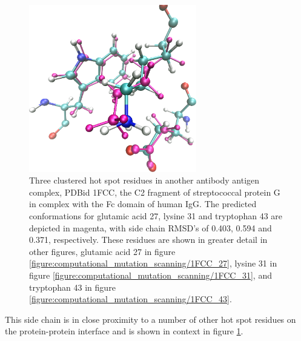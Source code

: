 \begin{figure}[h]
  \centering
  \includegraphics[width=0.65\textwidth,height=0.3\textheight,keepaspectratio]{figures/mutation_side_chain_images/1fcc_27_31_43.png}
  \caption{Three clustered hot spot residues in another antibody antigen complex, PDBid 1FCC, the C2 fragment of streptococcal protein G in complex with the Fc domain of human IgG.
The predicted conformations for glutamic acid 27, lysine 31 and tryptophan 43 are depicted in magenta, with side chain RMSD's of 0.403, 0.594 and 0.371, respectively.
These residues are shown in greater detail in other figures, glutamic acid 27 in figure \protect\ref{figure:computational_mutation_scanning/1FCC_27}, lysine 31 in figure \protect\ref{figure:computational_mutation_scanning/1FCC_31}, and tryptophan 43 in figure \protect\ref{figure:computational_mutation_scanning/1FCC_43}.}
  \label{figure:computational_mutation_scanning/1FCC_27_31_43}
\end{figure}
This side chain is in close proximity to a number of other hot spot residues on the protein-protein interface and is shown in context in figure \protect\ref{figure:computational_mutation_scanning/1FCC_27_31_43}.
